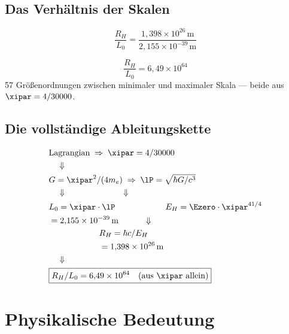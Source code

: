\subsection{Das Verhältnis der Skalen}

\begin{equation}
	\frac{R_H}{L_0} = \frac{1{,}398 \times 10^{26}\,\text{m}}{2{,}155 \times 10^{-39}\,\text{m}}
\end{equation}

\begin{keyresult}
\begin{equation}
	\boxed{\frac{R_H}{L_0} = 6{,}49 \times 10^{64}}
\end{equation}
57 Größenordnungen zwischen minimaler und maximaler Skala — beide aus $\xipar = 4/30000$.
\end{keyresult}

\subsection{Die vollständige Ableitungskette}

\begin{keyresult}
\begin{align}
	&\text{Lagrangian} \;\Rightarrow\; \xipar = 4/30000 \notag \\
	&\quad\Downarrow \notag \\
	&G = \xipar^2/(4m_e) \;\Rightarrow\; \lP = \sqrt{\hbar G/c^3} \notag \\
	&\quad\Downarrow\qquad\qquad\qquad\quad\Downarrow \notag \\
	&L_0 = \xipar \cdot \lP \qquad\qquad\qquad E_H = \Ezero \cdot \xipar^{41/4} \notag \\
	&= 2{,}155 \times 10^{-39}\,\text{m} \qquad\quad\Downarrow \notag \\
	&\qquad\qquad\qquad R_H = \hbar c/E_H \notag \\
	&\qquad\qquad\qquad = 1{,}398 \times 10^{26}\,\text{m} \notag \\
	&\quad\Downarrow \notag \\
	&\boxed{R_H/L_0 = 6{,}49 \times 10^{64} \quad \text{(aus } \xipar \text{ allein)}}
\end{align}
\end{keyresult}

\section{Physikalische Bedeutung}


